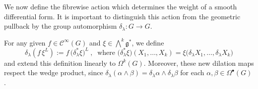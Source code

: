 \documentclass[dvipsnames]{amsart}
\theoremstyle{definition}
\theoremstyle{definition}
\numberwithin{equation}{section}
\begin{document}
We now define the fibrewise action which determines the weight of a
smooth differential form. It is important to distinguish this action
from the geometric pullback by the group automorphism
\(\delta_\lambda\colon G\to G\).

For any given $f\in\mathcal{C}^\infty(G)$ and $\xi\in\bigwedge^k\mathfrak{g}^\ast$, we define
\begin{equation}
\label{eq:fibrewise-dilation-forms} \delta_\lambda(f\,\xi^L)
:=
f\,
\bigl(\delta_\lambda^*\xi\bigr)^L\ ,\ \text{ where }\bigl(\delta_\lambda^*\xi\bigr)
(X_1,\ldots,X_k)
=
\xi\bigl(
\delta_\lambda X_1,\ldots,
\delta_\lambda X_k
\bigr)
\end{equation}
and extend this definition linearly to \(\Omega^k(G)\). Moreover, these new dilation maps  respect the wedge product, since $\delta_\lambda(\alpha\wedge\beta)=\delta_\lambda\alpha\wedge\delta_\lambda\beta$ for each $\alpha,\beta\in\Omega^\bullet(G)$.
\end{document}
